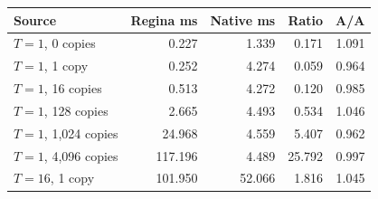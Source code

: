 \begin{center}
\small
\begin{tabular}{@{}lrrrr@{}}
\toprule
Source & Regina ms & Native ms & Ratio & A/A \\
\midrule
$T=1$, 0 copies & 0.227 & 1.339 & 0.171 & 1.091 \\
$T=1$, 1 copy & 0.252 & 4.274 & 0.059 & 0.964 \\
$T=1$, 16 copies & 0.513 & 4.272 & 0.120 & 0.985 \\
$T=1$, 128 copies & 2.665 & 4.493 & 0.534 & 1.046 \\
$T=1$, 1,024 copies & 24.968 & 4.559 & 5.407 & 0.962 \\
$T=1$, 4,096 copies & 117.196 & 4.489 & 25.792 & 0.997 \\
$T=16$, 1 copy & 101.950 & 52.066 & 1.816 & 1.045 \\
\bottomrule
\end{tabular}
\end{center}
